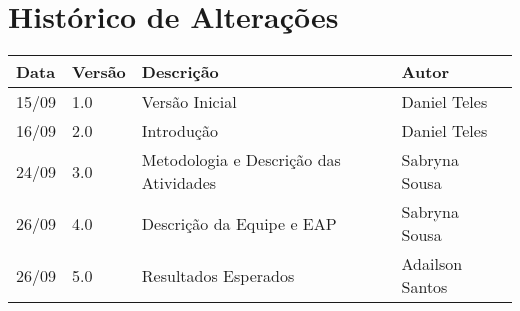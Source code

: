 \chapter*{Histórico de Alterações}

\begin{table}[!htpd]
\centering
\label{my-label}
\begin{tabular}{|l|l|l|l|}
\hline
\textbf{Data} & \textbf{Versão} & \textbf{Descrição} & \textbf{Autor} \\ \hline
15/09         & 1.0             & Versão Inicial     & Daniel Teles   \\ \hline
16/09         & 2.0             & Introdução         & Daniel Teles   \\ \hline
24/09         & 3.0             & Metodologia e Descrição das Atividades       & Sabryna Sousa  \\ \hline
26/09         & 4.0             & Descrição da Equipe e EAP       & Sabryna Sousa  \\ \hline
26/09         & 5.0             & Resultados Esperados       & Adailson Santos  \\ \hline
\end{tabular}
\end{table}

\cleardoublepage

